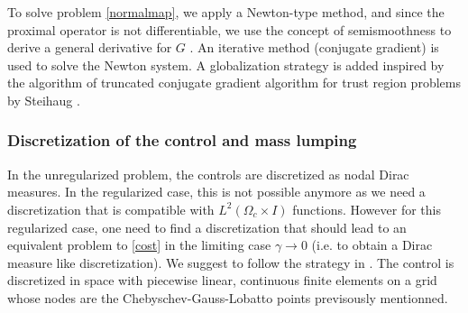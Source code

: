 \begin{rmk}
 To solve problem \eqref{normalmap}, we apply a Newton-type method, and since the proximal operator is not differentiable, we use the concept of semismoothness to derive a general derivative for $G$ \cite{ulbrich2002semismooth}. An iterative method (conjugate gradient) is used to solve the Newton system. A globalization strategy is added inspired by the algorithm of truncated conjugate gradient algorithm for trust region problems by Steihaug \cite{pieperthesis,steihaug1983}.
\end{rmk}


\subsubsection{Discretization of the control and mass lumping}
In the unregularized problem, the controls are discretized as nodal Dirac measures. In the regularized case, this is not possible anymore as we need a discretization that is compatible with $L^2(\Omega_c \times I)$ functions. However for this regularized case, one need to find a discretization that should lead to an equivalent problem to \eqref{cost} in the limiting case $\gamma \to 0$ (i.e. to obtain a Dirac measure like discretization). We suggest to follow the strategy in \cite{pieper2014}. The control is discretized in space with piecewise linear, continuous finite elements on a grid whose nodes are the Chebyschev-Gauss-Lobatto points previsously mentionned.

